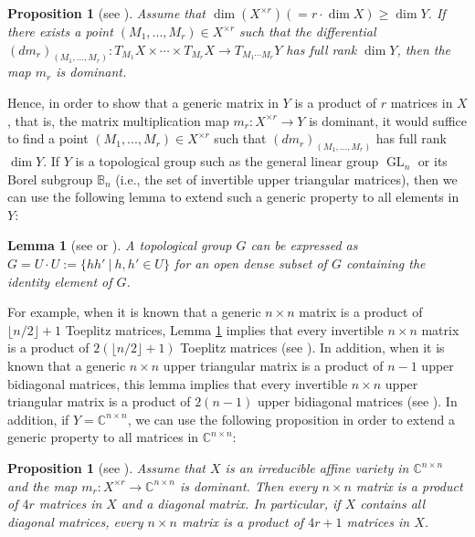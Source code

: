 \documentclass[reqno]{amsart}
\newtheorem{lemma}[theorem]{Lemma}
\newtheorem{proposition}[theorem]{Proposition}
\theoremstyle{definition}
\numberwithin{equation}{section}
\begin{document}
\begin{proposition}[see {\cite[Proposition 3.7]{ye2017new}}]\label{prop:the rank of differential and dominance}
    Assume that $\dim (X^{\times r}) (=r \cdot \dim X) \geq \dim Y$. If there exists a point $(M_1,...,M_r) \in X^{\times r}$ such that the differential $(dm_r)_{(M_1,...,M_r)}:T_{M_1}X \times \cdots \times T_{M_r}X \rightarrow T_{M_1\cdots M_r}Y$ has full rank $\dim Y$, then the map $m_r$ is dominant.
\end{proposition}

Hence, in order to show that a generic matrix in $Y$ is a product of $r$ matrices in $X$, that is, the matrix multiplication map $m_r: X^{\times r} \rightarrow Y$ is dominant, it would suffice to find a point $(M_1,...,M_r) \in X^{\times r}$ such that $(dm_r)_{(M_1,...,M_r)}$ has full rank $\dim Y$. If $Y$ is a topological group such as the general linear group $\operatorname{GL}_n$ or its Borel subgroup $\mathbb{B}_n$ (i.e., the set of invertible upper triangular matrices), then we can use the following lemma to extend such a generic property to all elements in $Y$:

\begin{lemma}[see {\cite[Proposition 1.1.3.(a)]{borel2012linear} or \cite[Proposition 3.8]{ye2017new}}]\label{lemma:topological group}
    A topological group $G$ can be expressed as $G=U \cdot U:=\{hh'~|~h,h' \in U\}$ for an open dense subset of $G$ containing the identity element of $G$.
\end{lemma}

For example, when it is known that a generic $n \times n$ matrix is a product of $\lfloor n/2 \rfloor +1$ Toeplitz matrices, Lemma \ref{lemma:topological group} implies that every invertible $n \times n$ matrix is a product of $2(\lfloor n/2 \rfloor +1)$ Toeplitz matrices (see \cite[Corollary 2]{ye2016every}). In addition, when it is known that a generic $n \times n$ upper triangular matrix is a product of $n-1$ upper bidiagonal matrices, this lemma implies that every invertible $n \times n$ upper triangular matrix is a product of $2(n-1)$ upper bidiagonal matrices (see \cite[Corollary 5.2]{ye2017new}). In addition, if $Y=\mathbb{C}^{n \times n}$, we can use the following proposition in order to extend a generic property to all matrices in $\mathbb{C}^{n \times n}$:

\begin{proposition}[see {\cite[Proposition 3.10]{ye2017new}}]\label{prop:the number of structured matrices needed to express every matrix}
    Assume that $X$ is an irreducible affine variety in $\mathbb{C}^{n \times n}$ and the map $m_r:X^{\times r} \rightarrow \mathbb{C}^{n \times n}$ is dominant. Then every $n \times n$ matrix is a product of $4r$ matrices in $X$ and a diagonal matrix. In particular, if $X$ contains all diagonal matrices, every $n \times n$ matrix is a product of $4r+1$ matrices in $X$.
\end{proposition}
\end{document}
